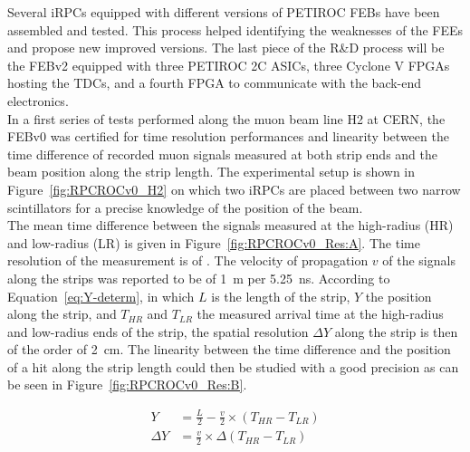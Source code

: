 	Several iRPCs equipped with different versions of PETIROC FEBs have been assembled and tested. This process helped identifying the weaknesses of the FEEs and propose new improved versions. The last piece of the R\&D process will be the FEBv2 equipped with three PETIROC 2C ASICs, three Cyclone V FPGAs hosting the TDCs, and a fourth FPGA to communicate with the back-end electronics.\\
	In a first series of tests performed along the muon beam line H2 at CERN, the FEBv0 was certified for time resolution performances and linearity between the time difference of recorded muon signals measured at both strip ends and the beam position along the strip length. The experimental setup is shown in Figure~\ref{fig:RPCROCv0_H2} on which two iRPCs are placed between two narrow scintillators for a precise knowledge of the position of the beam.\\
	The mean time difference between the signals measured at the high-radius (HR) and low-radius (LR) is given in Figure~\ref{fig:RPCROCv0_Res:A}. The time resolution of the measurement is of . The velocity of propagation $v$ of the signals along the strips was reported to be of \SI{1}{m} per \SI{5.25}{ns}. According to Equation~\ref{eq:Y-determ}, in which $L$ is the length of the strip, $Y$ the position along the strip, and $T_{HR}$ and $T_{LR}$ the measured arrival time at the high-radius and low-radius ends of the strip, the spatial resolution $\Delta Y$ along the strip is then of the order of \SI{2}{cm}. The linearity between the time difference and the position of a hit along the strip length could then be studied with a good precision as can be seen in Figure~\ref{fig:RPCROCv0_Res:B}.
	
\endgroup
	
    \begin{equation}
		\label{eq:Y-determ}
		\begin{aligned}
			Y &= \frac{L}{2} - \frac{v}{2} \times (T_{HR}-T_{LR})\\
			\Delta Y &= \frac{v}{2} \times \Delta(T_{HR}-T_{LR})
		\end{aligned}
    \end{equation}
    
\newpage
	 
